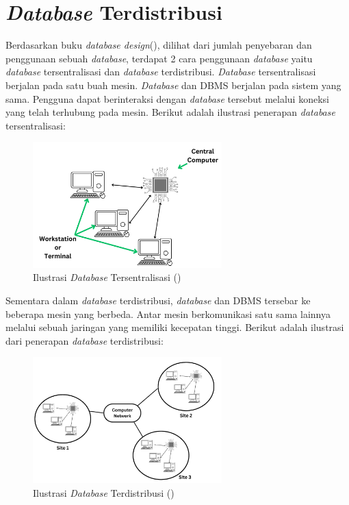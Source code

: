 \section{\emph{Database} Terdistribusi}

Berdasarkan buku \emph{database design}(\cite{databasedesignwatt}), dilihat dari jumlah penyebaran dan penggunaan sebuah \emph{database}, 
terdapat 2 cara penggunaan \emph{database} yaitu \emph{database} tersentralisasi 
dan \emph{database} terdistribusi. \emph{Database} tersentralisasi berjalan 
pada satu buah mesin. \emph{Database} dan DBMS berjalan pada sistem 
yang sama. Pengguna dapat berinteraksi dengan \emph{database} tersebut 
melalui koneksi yang telah terhubung pada mesin. Berikut 
adalah ilustrasi penerapan \emph{database} tersentralisasi:


\begin{figure}[H]
  \centering{}
	\includegraphics[width=0.65\textwidth]{gambar/bab2/centralized_db}
  \caption{Ilustrasi \emph{Database} Tersentralisasi (\cite{databasedesignwatt})}
\end{figure}

Sementara dalam \emph{database} terdistribusi, \emph{database} dan DBMS 
tersebar ke beberapa mesin yang berbeda. Antar mesin berkomunikasi 
satu sama lainnya melalui sebuah jaringan yang memiliki kecepatan 
tinggi. Berikut adalah ilustrasi dari penerapan \emph{database} terdistribusi:

\begin{figure}[H]
  \centering{}
	\includegraphics[width=0.65\textwidth]{gambar/bab2/distributed_db}
  \caption{Ilustrasi \emph{Database} Terdistribusi (\cite{databasedesignwatt})}
\end{figure}

